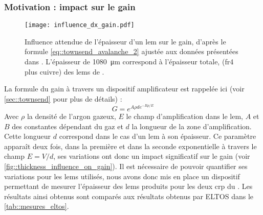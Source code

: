       \subsubsection{Motivation : impact sur le gain}
            
        \begin{figure}[htbp]
          \texttt{[image: influence\_dx\_gain.pdf]}
          \caption[Influence de l'épaisseur d'un \gls{lem} sur le gain.]{Influence attendue de l'épaisseur d'un \gls{lem} sur le gain, d'après le formule \eqref{eq::townsend_avalanche_2} ajustée aux données présentées dans \cite{Cantini2014}. L'épaisseur de \SI{1080}{\micro\meter} correspond à l'épaisseur totale, (\gls{fr4} plus cuivre) des \glspl{lem} de \cite{Cantini2014}.}
          \label{fig::thickness_influence_on_gain}
        \end{figure}
            
        La formule du gain à travers un dispositif amplificateur est rappelée ici (voir \autoref{sec::townsend} pour plus de détails) :
        \begin{equation}\label{eq::townsend_avalanche_2}
          G = e^{A\rho d e^{-B\rho /E}}
        \end{equation}
        Avec $\rho$ la densité de l'argon gazeux, $E$ le champ d'amplification dans le \gls{lem}, $A$ et $B$ des constantes dépendant du gaz et $d$ la longueur de la zone d'amplification. Cette longueur $d$ correspond dans le cas d'un \gls{lem} à son épaisseur. Ce paramètre apparaît deux fois, dans la première et dans la seconde exponentielle à travers le champ $E = V/d$, ses variations ont donc un impact significatif sur le gain (voir \autoref{fig::thickness_influence_on_gain}). Il est nécessaire de pouvoir quantifier ses variations pour les \glspl{lem} utilisés, nous avons donc mis en place un dispositif permettant de mesurer l'épaisseur des \glspl{lem} produits pour les deux \gls{crp} du \SSS{}. Les résultats ainsi obtenus sont comparés aux résultats obtenus par ELTOS dans le \autoref{tab::mesures_eltos}.
                

